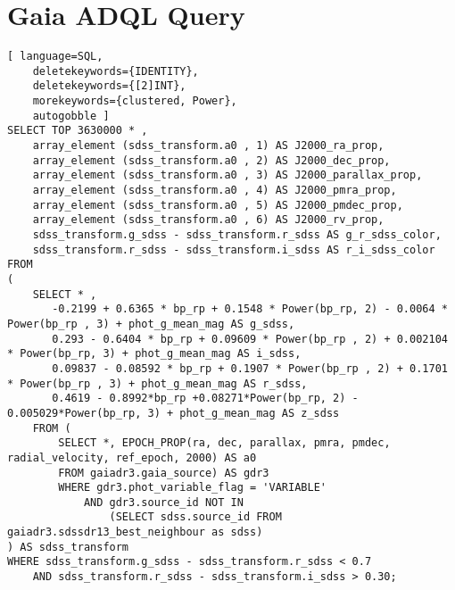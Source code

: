 \chapter{Gaia ADQL Query} \label{apendice:gaiaAdql}


\begin{lstlisting}[ language=SQL,
	deletekeywords={IDENTITY},
	deletekeywords={[2]INT},
	morekeywords={clustered, Power},
	autogobble ]
SELECT TOP 3630000 * ,
	array_element (sdss_transform.a0 , 1) AS J2000_ra_prop,
	array_element (sdss_transform.a0 , 2) AS J2000_dec_prop,
	array_element (sdss_transform.a0 , 3) AS J2000_parallax_prop,
	array_element (sdss_transform.a0 , 4) AS J2000_pmra_prop,
	array_element (sdss_transform.a0 , 5) AS J2000_pmdec_prop,
	array_element (sdss_transform.a0 , 6) AS J2000_rv_prop,
	sdss_transform.g_sdss - sdss_transform.r_sdss AS g_r_sdss_color,
	sdss_transform.r_sdss - sdss_transform.i_sdss AS r_i_sdss_color
FROM
(
	SELECT * ,
	   -0.2199 + 0.6365 * bp_rp + 0.1548 * Power(bp_rp, 2) - 0.0064 * Power(bp_rp , 3) + phot_g_mean_mag AS g_sdss,
	   0.293 - 0.6404 * bp_rp + 0.09609 * Power(bp_rp , 2) + 0.002104 * Power(bp_rp, 3) + phot_g_mean_mag AS i_sdss,
	   0.09837 - 0.08592 * bp_rp + 0.1907 * Power(bp_rp , 2) + 0.1701 * Power(bp_rp , 3) + phot_g_mean_mag AS r_sdss,
	   0.4619 - 0.8992*bp_rp +0.08271*Power(bp_rp, 2) - 0.005029*Power(bp_rp, 3) + phot_g_mean_mag AS z_sdss
	FROM (
		SELECT *, EPOCH_PROP(ra, dec, parallax, pmra, pmdec, radial_velocity, ref_epoch, 2000) AS a0
		FROM gaiadr3.gaia_source) AS gdr3
		WHERE gdr3.phot_variable_flag = 'VARIABLE'
			AND gdr3.source_id NOT IN
				(SELECT sdss.source_id FROM gaiadr3.sdssdr13_best_neighbour as sdss)
) AS sdss_transform
WHERE sdss_transform.g_sdss - sdss_transform.r_sdss < 0.7
	AND sdss_transform.r_sdss - sdss_transform.i_sdss > 0.30;

\end{lstlisting}